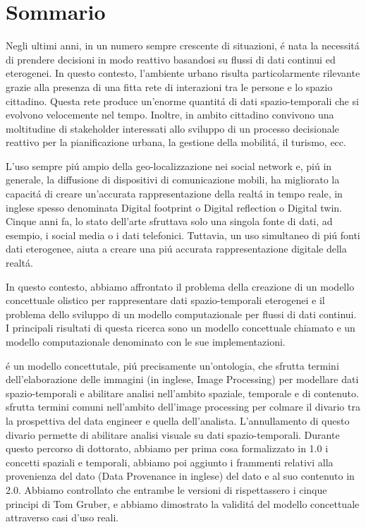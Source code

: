 \chapter*{Sommario}
Negli ultimi anni, in un numero sempre crescente di situazioni, \'e nata la necessit\'a di prendere decisioni in modo reattivo basandosi su flussi di dati continui ed eterogenei.
In questo contesto, l'ambiente urbano risulta particolarmente rilevante grazie alla presenza di una fitta rete di interazioni tra le persone e lo spazio cittadino.
Questa rete produce un'enorme quantit\'a di dati spazio-temporali che si evolvono velocemente nel tempo.
Inoltre, in ambito cittadino convivono una moltitudine di stakeholder interessati allo sviluppo di un processo decisionale reattivo per la pianificazione urbana, la gestione della mobilit\'a, il turismo, ecc.

L'uso sempre pi\'u ampio della geo-localizzazione nei social network e, pi\'u in generale, la diffusione di dispositivi di comunicazione mobili, ha migliorato la capacit\'a di creare un'accurata rappresentazione della realt\'a in tempo reale, in inglese spesso denominata Digital footprint o Digital reflection o Digital twin.
Cinque anni fa, lo stato dell'arte sfruttava solo una singola fonte di dati, ad esempio, i social media o i dati telefonici.
Tuttavia, un uso simultaneo di pi\'u fonti dati eterogenee, aiuta a creare una pi\'u accurata rappresentazione digitale della realt\'a.

In questo contesto, abbiamo affrontato il problema della creazione di un modello concettuale olistico per rappresentare dati spazio-temporali eterogenei e il problema dello sviluppo di un modello computazionale per flussi di dati continui.
I principali risultati di questa ricerca sono un modello concettuale chiamato \frappe{} e un modello computazionale denominato \river{} con le sue implementazioni.

\sloppy
\frappe{} \'e un modello concettutale, pi\'u precisamente un'ontologia, che sfrutta termini dell'elaborazione delle immagini (in inglese, Image Processing) per modellare dati spazio-temporali e abilitare analisi nell'ambito spaziale, temporale e di contenuto.
\frappe{} sfrutta termini comuni nell'ambito dell'image processing per colmare il divario tra la prospettiva del data engineer e quella dell'analista.
L'annullamento di questo divario permette di abilitare analisi visuale su dati spazio-temporali.
Durante questo percorso di dottorato, abbiamo per prima cosa formalizzato in \frappe{} 1.0 i concetti spaziali e temporali, abbiamo poi aggiunto i frammenti relativi alla provenienza del dato (Data Provenance in inglese) del dato e al suo contenuto in \frappe{} 2.0.
Abbiamo controllato che entrambe le versioni di \frappe{} rispettassero i cinque principi di Tom Gruber, e abbiamo dimostrato la validit\'a del modello concettuale attraverso casi d'uso reali.

